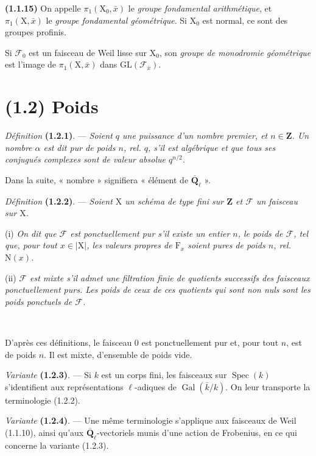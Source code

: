 \documentclass[11pt,leqno]{article}
\newcommand{\Page}[1]{\ifvmode\noindent\else\unskip\ \fi{\footnotesize\textcolor{gray}{[p.\,#1]}}\ \ignorespaces}
\begin{document}
\textbf{(1.1.15)} On appelle \(\pi_1(\mathrm{X}_0,\bar{x})\) le \textit{groupe fondamental arithmétique}, et \(\pi_1(\mathrm{X},\bar{x})\) le \textit{groupe fondamental géométrique}. Si \(\mathrm{X}_0\) est normal, ce sont des groupes profinis.

Si \(\mathscr{F}_0\) est un faisceau de Weil lisse sur \(\mathrm{X}_0\), son \textit{groupe de monodromie géométrique} est l’image de \(\pi_1(\mathrm{X},\bar{x})\) dans \(\mathrm{GL}(\mathscr{F}_{\bar{x}})\).

\section*{(1.2) Poids}

\textit{Définition} \textbf{(1.2.1)}. — \textit{Soient \(q\) une puissance d’un nombre premier, et \(n\in\mathbf{Z}\). Un nombre \(\alpha\) est dit \textup{pur de poids} \(n\), rel. \(q\), s’il est algébrique et que tous ses conjugués complexes sont de valeur absolue \(q^{n/2}\).}

Dans la suite, « nombre » signifiera « élément de \(\overline{\mathbf{Q}}_\ell\) ».

\textit{Définition} \textbf{(1.2.2)}. — \textit{Soient \(\mathrm{X}\) un schéma de type fini sur \(\mathbf{Z}\) et \(\mathscr{F}\) un faisceau sur \(\mathrm{X}\).}

(i) \textit{On dit que \(\mathscr{F}\) est \textup{ponctuellement pur} s’il existe un entier \(n\), le \textup{poids} de \(\mathscr{F}\), tel que, pour tout \(x\in|\mathrm{X}|\), les valeurs propres de \(\mathrm{F}_x\) soient pures de poids \(n\), rel. \(\mathrm{N}(x)\).}

(ii) \textit{\(\mathscr{F}\) est \textup{mixte} s’il admet une filtration finie de quotients successifs des faisceaux ponctuellement purs. Les poids de ceux de ces quotients qui sont non nuls sont les \textup{poids ponctuels} de \(\mathscr{F}\).}

\Page{154}

D’après ces définitions, le faisceau \(0\) est ponctuellement pur et, pour tout \(n\), est de poids \(n\). Il est mixte, d’ensemble de poids vide.

\textit{Variante} \textbf{(1.2.3)}. — Si \(k\) est un corps fini, les faisceaux sur \(\operatorname{Spec}(k)\) s’identifient aux représentations \(\ell\)-adiques de \(\operatorname{Gal}(\bar{k}/k)\). On leur transporte la terminologie (1.2.2).

\textit{Variante} \textbf{(1.2.4)}. — Une même terminologie s’applique aux faisceaux de Weil (1.1.10), ainsi qu’aux \(\overline{\mathbf{Q}}_\ell\)-vectoriels munis d’une action de Frobenius, en ce qui concerne la variante (1.2.3).
\end{document}
